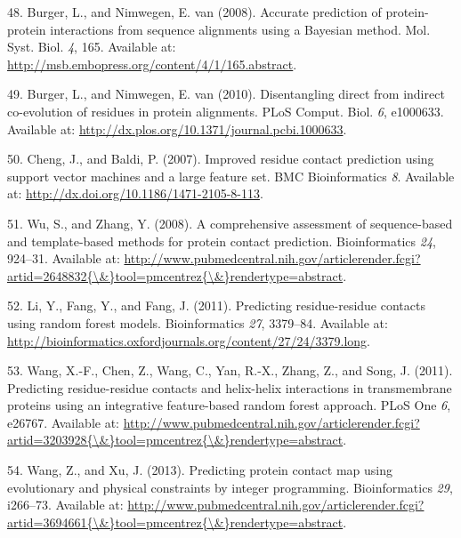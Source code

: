 \documentclass[12pt,a4paper,twoside]{book}
\theoremstyle{definition}
\theoremstyle{definition}
\theoremstyle{remark}
\begin{document}
\hypertarget{ref-Burger2008}{}
48. Burger, L., and Nimwegen, E. van (2008). Accurate prediction of
protein-protein interactions from sequence alignments using a Bayesian
method. Mol. Syst. Biol. \emph{4}, 165. Available at:
\url{http://msb.embopress.org/content/4/1/165.abstract}.

\hypertarget{ref-Burger2010}{}
49. Burger, L., and Nimwegen, E. van (2010). Disentangling direct from
indirect co-evolution of residues in protein alignments. PLoS Comput.
Biol. \emph{6}, e1000633. Available at:
\url{http://dx.plos.org/10.1371/journal.pcbi.1000633}.

\hypertarget{ref-Cheng2007}{}
50. Cheng, J., and Baldi, P. (2007). Improved residue contact prediction
using support vector machines and a large feature set. BMC
Bioinformatics \emph{8}. Available at:
\url{http://dx.doi.org/10.1186/1471-2105-8-113}.

\hypertarget{ref-Wu2008}{}
51. Wu, S., and Zhang, Y. (2008). A comprehensive assessment of
sequence-based and template-based methods for protein contact
prediction. Bioinformatics \emph{24}, 924--31. Available at:
\href{http://www.pubmedcentral.nih.gov/articlerender.fcgi?artid=2648832\%7B/\&\%7Dtool=pmcentrez\%7B/\&\%7Drendertype=abstract}{http://www.pubmedcentral.nih.gov/articlerender.fcgi?artid=2648832\{\textbackslash{}\&\}tool=pmcentrez\{\textbackslash{}\&\}rendertype=abstract}.

\hypertarget{ref-Li2011}{}
52. Li, Y., Fang, Y., and Fang, J. (2011). Predicting residue-residue
contacts using random forest models. Bioinformatics \emph{27}, 3379--84.
Available at:
\url{http://bioinformatics.oxfordjournals.org/content/27/24/3379.long}.

\hypertarget{ref-Wang2011}{}
53. Wang, X.-F., Chen, Z., Wang, C., Yan, R.-X., Zhang, Z., and Song, J.
(2011). Predicting residue-residue contacts and helix-helix interactions
in transmembrane proteins using an integrative feature-based random
forest approach. PLoS One \emph{6}, e26767. Available at:
\href{http://www.pubmedcentral.nih.gov/articlerender.fcgi?artid=3203928\%7B/\&\%7Dtool=pmcentrez\%7B/\&\%7Drendertype=abstract}{http://www.pubmedcentral.nih.gov/articlerender.fcgi?artid=3203928\{\textbackslash{}\&\}tool=pmcentrez\{\textbackslash{}\&\}rendertype=abstract}.

\hypertarget{ref-Wang2013}{}
54. Wang, Z., and Xu, J. (2013). Predicting protein contact map using
evolutionary and physical constraints by integer programming.
Bioinformatics \emph{29}, i266--73. Available at:
\href{http://www.pubmedcentral.nih.gov/articlerender.fcgi?artid=3694661\%7B/\&\%7Dtool=pmcentrez\%7B/\&\%7Drendertype=abstract}{http://www.pubmedcentral.nih.gov/articlerender.fcgi?artid=3694661\{\textbackslash{}\&\}tool=pmcentrez\{\textbackslash{}\&\}rendertype=abstract}.
\end{document}
